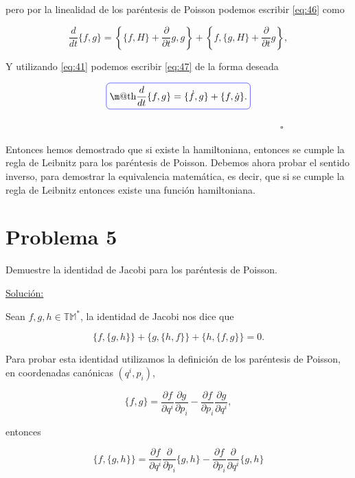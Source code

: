 \documentclass[a4paper,10pt]{article}
\makeatletter
\numberwithin{equation}{section}
\newcommand*{\boxcolor}{blue}
\renewcommand{\boxed}[1]{\textcolor{\boxcolor}{%
\tikz[baseline={([yshift=-1ex]current bounding box.center)}] \node [rectangle, minimum width=1ex,rounded corners,draw] {\normalcolor\m@th$\displaystyle#1$};}}
\makeatother
\begin{document}
pero por la linealidad de los paréntesis de Poisson podemos escribir \eqref{eq:46} como

\begin{equation}
  \frac{d}{dt}\{f,g\} = \left\{\{f,H\} + \frac{\partial}{\partial t}g, g\right\} + 
  \left\{f,\{g,H\} + \frac{\partial}{\partial t}g\right\},
  \label{eq:47}
\end{equation}

Y utilizando \eqref{eq:41} podemos escribir \eqref{eq:47} de la forma deseada

\begin{equation}
 \boxed{\frac{d}{dt}\{f,g\} = \{\dot{f},g\} + \{f,\dot{g}\}.}
\end{equation}

$\hspace{12cm} \square$

Entonces hemos demostrado que si existe la hamiltoniana, entonces se cumple la regla 
de Leibnitz para los paréntesis de Poisson. Debemos ahora probar el sentido inverso, 
para demostrar la equivalencia matemática, es decir, que si se cumple la regla de 
Leibnitz entonces existe una función hamiltoniana.


\section{Problema 5}

Demuestre la identidad de Jacobi para los paréntesis de Poisson.

\vspace{.3cm}

\underline{Solución:} \vspace{.3cm}

Sean $f,g,h \in \mathbb{TM}^*$, la identidad de Jacobi nos dice que 

\begin{equation}
 \{f,\{g,h\}\} + \{g,\{h,f\}\} + \{h,\{f,g\}\} = 0.
\end{equation}

Para probar esta identidad utilizamos la definición de los paréntesis de Poisson, 
en coordenadas canónicas $(q^i,p_i)$, 

\begin{equation}
 \{f,g\} = \frac{\partial f}{\partial q^i}\frac{\partial g}{\partial p_i} - 
 \frac{\partial f}{\partial p_i}\frac{\partial g}{\partial q^i},
\end{equation}

entonces 

\begin{equation}
  \{f,\{g,h\}\} = \frac{\partial f}{\partial q^i}\frac{\partial }{\partial p_i}\{g,h\} - 
 \frac{\partial f}{\partial p_i}\frac{\partial }{\partial q^i}\{g,h\}
\end{equation}
\end{document}
